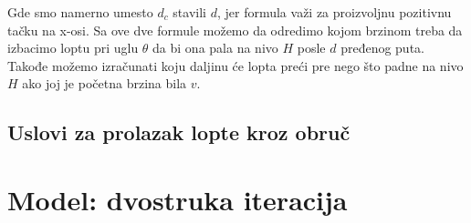 \documentclass[a4paper, 12pt]{article}
\begin{document}
Gde smo namerno umesto $d_c$ stavili $d$, jer formula važi za proizvoljnu pozitivnu tačku na x-osi. Sa ove dve formule možemo da odredimo kojom brzinom treba da izbacimo loptu pri uglu $\theta$ da bi ona pala na nivo $H$ posle $d$ pređenog puta. Takođe možemo izračunati koju daljinu će lopta preći pre nego što padne na nivo $H$ ako joj je početna brzina bila $v$.

\pagebreak

\subsection{Uslovi za prolazak lopte kroz obruč}



\section{Model: dvostruka iteracija}
\end{document}
